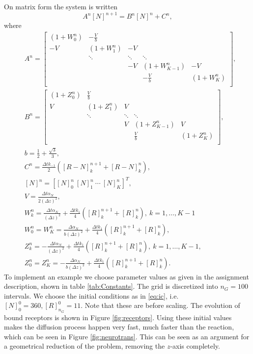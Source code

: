 \documentclass{article}
\begin{document}
On matrix form the system is written
\begin{equation}\label{eq:system}
        A^n[N]^{n+1} = B^n[N]^n + C^n,
\end{equation}
where
\begin{align*}
        &A^n =   
\begin{bmatrix}
        \left( 1 + W_0^n \right) & -\frac{V}{b} &   &  &  \\
        -V & \left(1 + W_1^n \right) & -V  &  &   \\
         & \ddots & \ddots & \ddots &    \\
         &  & -V & \left( 1 + W_{K-1}^n \right) & -V   \\
         &  &  &  -\frac{V}{b} & \left( 1 + W_K^n \right) \\
\end{bmatrix}
,\\
        &B^n = 
\begin{bmatrix}
        \left( 1 + Z_0^n \right) & \frac{V}{b} &   &  &  \\
        V & \left(1 + Z_1^n \right) & V  &  &   \\
         & \ddots & \ddots & \ddots &    \\
         &  & V & \left( 1 + Z_{K-1}^n \right) & V   \\
         &  &  &  \frac{V}{b} & \left( 1 + Z_K^n \right) \\
\end{bmatrix}
,\\
        &b = \frac{1}{2} + \frac{\sqrt{3}}{3}, \\
        &C^n= \frac{\Delta t k_{-1}}{2}([R-N]_k^{n+1} + [R-N]_k^n ) ,\\
        &[N]^n = [[N]_0^n \ [N]_1^n \ \cdots \ [N]_K^n]^T ,\\
        &V = \frac{\Delta t \alpha_N}{2(\Delta z)^2} ,\\
        &W_k^n = \frac{\Delta t \alpha_N}{(\Delta z)^2} + \frac{\Delta t k_1}{4}([R]_{k}^{n+1} + [R]_k^n), \ k = 1, \hdots, K - 1 \\
        &W_0^n = W_K^n = \frac{\Delta \alpha_N}{b(\Delta z)^2} + \frac{\Delta t k_1}{4}([R]_{k}^{n+1} + [R]_k^n),\\
        &Z_k^n = -\frac{\Delta t \alpha_N}{(\Delta z)^2} + \frac{\Delta t k_1}{4}([R]_{k}^{n+1} + [R]_k^n), \ k = 1, \hdots, K- 1, \\
        &Z_0^n = Z_K^n = -\frac{\Delta \alpha_N}{b(\Delta z)^2} + \frac{\Delta t k_1}{4}([R]_{k}^{n+1} + [R]_k^n).
\end{align*}
To implement an example we choose parameter values as given in the assignment description, shown in table \ref{tab:Constants}.
The grid is discretized into $n_G = 100$ intervals.
We choose the initial conditions as in \eqref{eq:ic}, i.e. $[N]_0^0 = 360, [R]_{n_G}^0 = 11$. Note that these are before scaling.
The evolution of bound receptors is shown in Figure \ref{fig:receptors}.
Using these initial values makes the diffusion process happen very fast, much faster than the reaction, which can be seen in Figure \ref{fig:neurotrans}.
This can be seen as an argument for a geometrical reduction of the problem, removing the $z$-axis completely.
\end{document}
